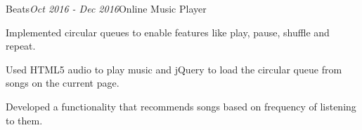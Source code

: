 \begin{rSubsection}{Beats}{\em Oct 2016 - Dec 2016}{Online Music Player}{}
    \item Implemented circular queues to enable features like play, pause, shuffle and repeat.
    \item Used HTML5 audio to play music and jQuery to load the circular queue from songs on the current page.
    \item Developed a functionality that recommends songs based on frequency of listening to them.
\end{rSubsection}
